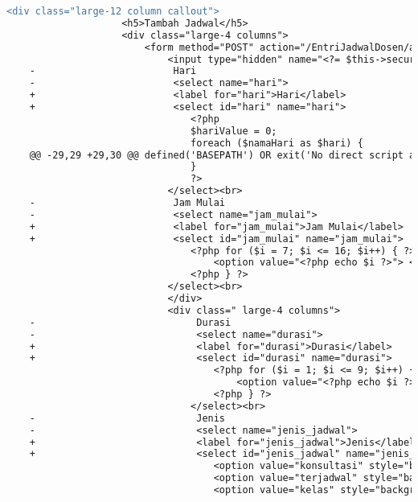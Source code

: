 \begin{lstlisting}[frame=single, label={lst:perbaikan_3.3.2_label_masukan}, language=diff, caption=Perbaikan Kriteria Sukses 3.3.2 - Tidak Terdapat Label pada Kolom Masukan]
                <div class="large-12 column callout">
                    <h5>Tambah Jadwal</h5>
                    <div class="large-4 columns">
                        <form method="POST" action="/EntriJadwalDosen/add">
                            <input type="hidden" name="<?= $this->security->get_csrf_token_name() ?>" value="<?= $this->security->get_csrf_hash() ?>" />
    -                        Hari
    -                        <select name="hari"> 
    +                        <label for="hari">Hari</label>
    +                        <select id="hari" name="hari"> 
                                <?php
                                $hariValue = 0;
                                foreach ($namaHari as $hari) {
    @@ -29,29 +29,30 @@ defined('BASEPATH') OR exit('No direct script access allowed');
                                }
                                ?>
                            </select><br>
    -                        Jam Mulai
    -                        <select name="jam_mulai"> 
    +                        <label for="jam_mulai">Jam Mulai</label>
    +                        <select id="jam_mulai" name="jam_mulai"> 
                                <?php for ($i = 7; $i <= 16; $i++) { ?>
                                    <option value="<?php echo $i ?>"> <?php echo $i ?>:00 </option>
                                <?php } ?>
                            </select><br>
                            </div>
                            <div class=" large-4 columns">
    -                            Durasi
    -                            <select name="durasi"> 
    +                            <label for="durasi">Durasi</label>
    +                            <select id="durasi" name="durasi"> 
                                    <?php for ($i = 1; $i <= 9; $i++) { ?>
                                        <option value="<?php echo $i ?>"> <?php echo $i ?> jam </option>
                                    <?php } ?>
                                </select><br>
    -                            Jenis  
    -                            <select name="jenis_jadwal"> 
    +                            <label for="jenis_jadwal">Jenis</label>
    +                            <select id="jenis_jadwal" name="jenis_jadwal"> 
                                    <option value="konsultasi" style="background-color:yellow"> Konsultasi </option>
                                    <option value="terjadwal" style="background-color:green;color:white"> Terjadwal</option>
                                    <option value="kelas" style="background-color:white"> Kelas </option>

\end{lstlisting}
